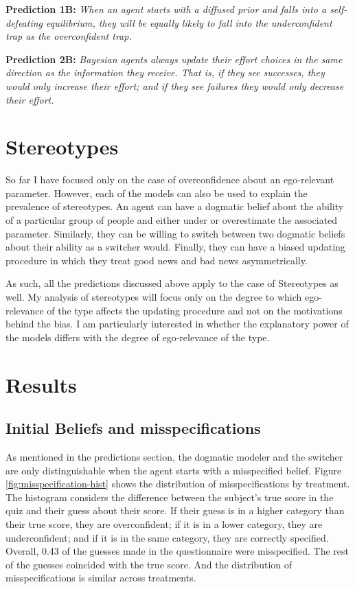 \documentclass[
  12pt,
]{article}
\begin{document}
\textbf{Prediction 1B:} \emph{When an agent starts with a diffused prior
and falls into a self-defeating equilibrium, they will be equally likely
to fall into the underconfident trap as the overconfident trap.}

\textbf{Prediction 2B:} \emph{Bayesian agents always update their effort
choices in the same direction as the information they receive. That is,
if they see successes, they would only increase their effort; and if
they see failures they would only decrease their effort.}

\hypertarget{stereotypes}{%
\section{Stereotypes}\label{stereotypes}}

So far I have focused only on the case of overconfidence about an
ego-relevant parameter. However, each of the models can also be used to
explain the prevalence of stereotypes. An agent can have a dogmatic
belief about the ability of a particular group of people and either
under or overestimate the associated parameter. Similarly, they can be
willing to switch between two dogmatic beliefs about their ability as a
switcher would. Finally, they can have a biased updating procedure in
which they treat good news and bad news asymmetrically.

As such, all the predictions discussed above apply to the case of
Stereotypes as well. My analysis of stereotypes will focus only on the
degree to which ego-relevance of the type affects the updating procedure
and not on the motivations behind the bias. I am particularly interested
in whether the explanatory power of the models differs with the degree
of ego-relevance of the type.

\hypertarget{results}{%
\section{Results}\label{results}}

\hypertarget{initial-beliefs-and-misspecifications}{%
\subsection{Initial Beliefs and
misspecifications}\label{initial-beliefs-and-misspecifications}}

As mentioned in the predictions section, the dogmatic modeler and the
switcher are only distinguishable when the agent starts with a
misspecified belief. Figure \ref{fig:misspecification-hist} shows the
distribution of misspecifications by treatment. The histogram considers
the difference between the subject's true score in the quiz and their
guess about their score. If their guess is in a higher category than
their true score, they are overconfident; if it is in a lower category,
they are underconfident; and if it is in the same category, they are
correctly specified. Overall, 0.43 of the guesses made in the
questionnaire were misspecified. The rest of the guesses coincided with
the true score. And the distribution of misspecifications is similar
across treatments.
\end{document}

